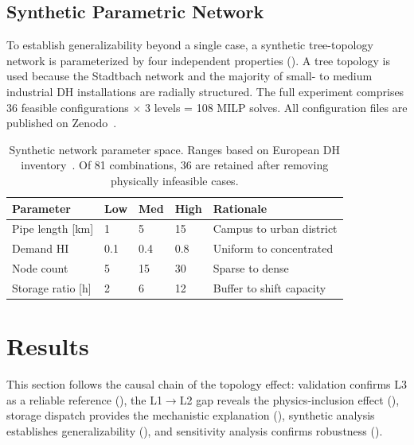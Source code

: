 \documentclass[review,3p]{elsarticle}
\begin{document}
\subsection{Synthetic Parametric Network}
\label{sec:case_synthetic}

To establish generalizability beyond a single case, a synthetic
tree-topology network is parameterized by four independent properties
(). A tree topology is used because the Stadtbach
network and the majority of small- to medium industrial DH installations
are radially structured. The full experiment comprises 36 feasible
configurations $\times$ 3 levels = 108 MILP solves. All configuration
files are published on Zenodo~\cite{Zenodo_data}.

\begin{table}[htbp]
\centering
\caption{Synthetic network parameter space. Ranges based on European
DH inventory~\cite{Werner2017,Frederiksen2013}. Of 81 combinations,
36 are retained after removing physically infeasible cases.}
\label{tab:synthetic}
\begin{tabular}{@{}llllp{4.0cm}@{}}
\toprule
Parameter & Low & Med & High & Rationale \\
\midrule
Pipe length [km]  & 1  & 5  & 15  & Campus to urban district \\
Demand HI          & 0.1 & 0.4 & 0.8 & Uniform to concentrated \\
Node count         & 5  & 15 & 30  & Sparse to dense \\
Storage ratio [h]  & 2  & 6  & 12  & Buffer to shift capacity \\
\bottomrule
\end{tabular}
\end{table}

\section{Results}
\label{sec:results}

This section follows the causal chain of the topology effect:
validation confirms L3 as a reliable reference (),
the L1$\rightarrow$L2 gap reveals the physics-inclusion effect
(), storage dispatch provides the mechanistic
explanation (), synthetic analysis establishes
generalizability (), and sensitivity
analysis confirms robustness ().
\end{document}
